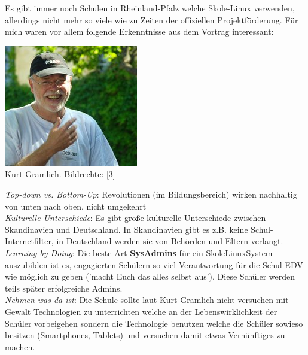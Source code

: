 Es gibt immer noch Schulen in Rheinland-Pfalz welche Skole-Linux verwenden, allerdings nicht mehr so viele wie zu Zeiten der offiziellen Projektförderung. Für mich waren vor allem folgende Erkenntnisse aus dem Vortrag interessant:

\begin{center}
\includegraphics[width=\linewidth]{chemnitz/chemnitz-kurt.jpg} \\
\footnotesize{Kurt Gramlich. Bildrechte: [3]}
\end{center}

\textit{Top-down vs. Bottom-Up}: Revolutionen (im Bildungsbereich) wirken nachhaltig von unten nach oben, nicht umgekehrt \\

\textit{Kulturelle Unterschiede}: Es gibt große kulturelle Unterschiede zwischen Skandinavien und Deutschland. In Skandinavien gibt es z.B. keine Schul-Internetfilter, in Deutschland werden sie von Behörden und Eltern verlangt. \\

\textit{Learning by Doing}: Die beste Art \textbf{SysAdmins} für ein SkoleLinuxSystem auszubilden ist es, engagierten Schülern so viel Verantwortung für die Schul-EDV wie möglich zu geben ('macht Euch das alles selbst aus'). Diese Schüler werden teils später erfolgreiche Admins. \\

\textit{Nehmen was da ist}: Die Schule sollte laut Kurt Gramlich nicht versuchen mit Gewalt Technologien zu unterrichten welche an der Lebenswirklichkeit der Schüler vorbeigehen sondern die Technologie benutzen welche die Schüler sowieso besitzen (Smartphones, Tablets) und versuchen damit etwas Vernünftiges zu machen. \\

